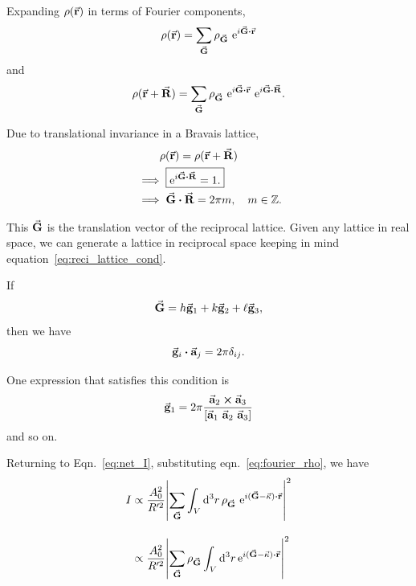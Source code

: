 	Expanding $\rho(\va{r})$ in terms of Fourier components,%
%		
	\begin{equation}
	\rho(\va{r}) = \sum_{\va{G}} \rho_{\va{G}} ~ \e{ i \va{G} \vdot \va{r} } \label{eq:fourier_rho}
	\end{equation}
%	
	and%
%	
	\begin{equation}
	\rho(\va{r} + \va{R}) = \sum_{\va{G}} \rho_{\va{G}} ~ \e{ i \va{G} \vdot \va{r} } ~ \e{ i \va{G} \vdot \va{R} }.
	\end{equation}
	
	Due to translational invariance in a Bravais lattice,%
%	
	\begin{align}
	&\phantom{\implies} \rho (\va{r}) = \rho( \va{r} + \va{R} ) \nonumber \\
	&\implies \boxed{ \e{i \va{G} \vdot \va{R} } = 1.} \\ \label{eq:reci_lattice_cond}
	&\implies \va{G} \vdot \va{R} = 2\pi m, \quad m \in \mathbb{Z}.
	\end{align}
	
	This $\va{G}$ is the translation vector of the reciprocal lattice. Given any lattice in real space, we can generate a lattice in reciprocal space keeping in mind equation~\eqref{eq:reci_lattice_cond}.
	
	If%
%	
	\begin{equation}
	\va{G} = h \va{g}_1 + k \va{g}_2 + \ell \va{g}_3,\label{eq:reci_lattice_vec}
	\end{equation}%
%	
	then we have%
%	
	\begin{equation}
	\va{g}_i \vdot \va{a}_j = 2\pi \delta_{ij}.\label{eq:relation_g_a}
	\end{equation}%
	
	One expression that satisfies this condition is%
%	
	\begin{equation}
	\va{g}_1 = 2\pi \dfrac{\va{a}_2 \cross \va{a}_3}{\qty[ \va{a}_1 ~ \va{a}_2 ~ \va{a}_3 ]}
	\end{equation}%
%	
	and so on.
	
	Returning to Eqn.~\eqref{eq:net_I}, substituting eqn.~\eqref{eq:fourier_rho}, we have%
%	
	\begin{align}
	I &\propto \dfrac{A_0^2}{R'^2} \abs{ \sum_{\va{G}} \int_V \dd[3]{r} \rho_{\va{G}} ~ \e{ i (\va{G} - \va{\kappa}) \vdot \va{r} } }  ^2 \nonumber \\[1em]
	  &\propto \dfrac{A_0^2}{R'^2} \abs{ \sum_{\va{G}} \rho_{\va{G}} \int_V \dd[3]{r} \e{ i (\va{G} - \va{\kappa}) \vdot \va{r} } }^2
	\end{align}%
	
